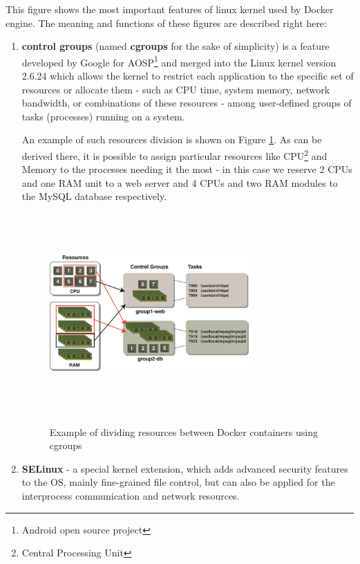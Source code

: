 This figure shows the most important features
of linux kernel used by Docker engine. The meaning and
functions of these figures are described right here:

\begin{enumerate}
\item \textbf{control groups} (named \textbf{cgroups} for the sake of simplicity) is
a feature developed by Google
for AOSP\footnote{Android open source project} and merged
into the Linux kernel version 2.6.24\cite{CGroupsMerged}
which allows the kernel to restrict
each application to the specific set of resources or allocate them -
such as CPU time, system memory, network bandwidth,
or combinations of these resources - among user-defined groups
of tasks (processes) running on a system\cite{CGroupsDefinition}.

An example of such resources division is
shown on Figure \ref{fig:DockerCGroupsPic}.
As can be derived there, it is possible to assign
particular resources
like CPU\footnote{Central Processing Unit} and Memory to the
processes needing it the most -
in this case we reserve 2 CPUs and one RAM
unit to a web server and 4 CPUs and two RAM modules
to the MySQL database respectively.

\begin{figure}
\includegraphics[height=3in, width=3in]{dockerCGroups}
\caption{Example of dividing resources between Docker containers using cgroups}
\cite{DockerCGroupsPic}
\label{fig:DockerCGroupsPic}
\end{figure}

\item \textbf{SELinux} - a special kernel extension, which adds advanced security features to
the OS, mainly fine-grained file control, but can also be applied
for the interprocess communication and network resources\cite{SELinuxDef}.


\end{enumerate}
